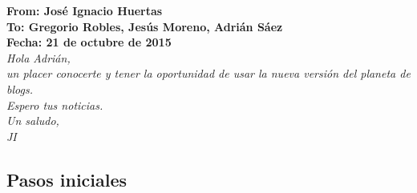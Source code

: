 \documentclass[a4paper, 12pt]{book}
\begin{document}
\begin{shaded}
\noindent\textbf{\textsf{
From: Jos\'e Ignacio Huertas\\
To: Gregorio Robles, Jes\'us Moreno, Adri\'an S\'aez\\
Fecha: 21 de octubre de 2015\\
}}
\emph{
Hola Adri\'an,\\
un placer conocerte y tener la oportunidad de usar la nueva versi\'on del planeta de blogs.\\
Espero tus noticias.\\
Un saludo,\\
JI
}\newline
\end{shaded}

\subsection{Pasos iniciales}
\label{subseccion:correosypasos}
\end{document}
